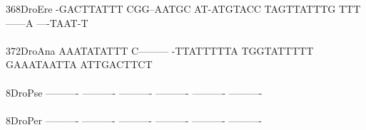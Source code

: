 \documentclass[11pt,twoside,reqno,a4paper]{article}
\begin{document}
{368\hspace*{2\charwidth}DroEre	-GACTTATTT	CGG--AATGC	AT-ATGTACC	TAGTTATTTG	TTT------A	----TAAT-T	\\
\hspace*{5\charwidth}\hspace*{7\charwidth}\hspace*{1\charwidth}\hspace*{1\charwidth}\hspace*{1\charwidth}\hspace*{1\charwidth}\hspace*{1\charwidth}\hspace*{1\charwidth}\\
372\hspace*{2\charwidth}DroAna	AAATATATTT	C---------	-TTATTTTTA	TGGTATTTTT	GAAATAATTA	ATTGACTTCT	\\
\hspace*{5\charwidth}\hspace*{7\charwidth}\hspace*{1\charwidth}\hspace*{1\charwidth}\hspace*{1\charwidth}\hspace*{1\charwidth}\hspace*{1\charwidth}\hspace*{1\charwidth}\\
8\hspace*{4\charwidth}DroPse	----------	----------	----------	----------	----------	----------	\\
\hspace*{5\charwidth}\hspace*{7\charwidth}\hspace*{1\charwidth}\hspace*{1\charwidth}\hspace*{1\charwidth}\hspace*{1\charwidth}\hspace*{1\charwidth}\hspace*{1\charwidth}\\
8\hspace*{4\charwidth}DroPer	----------	----------	----------	----------	----------	----------	\\
\hspace*{5\charwidth}\hspace*{7\charwidth}\hspace*{1\charwidth}\hspace*{1\charwidth}\hspace*{1\charwidth}\hspace*{1\charwidth}\hspace*{1\charwidth}\hspace*{1\charwidth}\\
}
\end{document}
